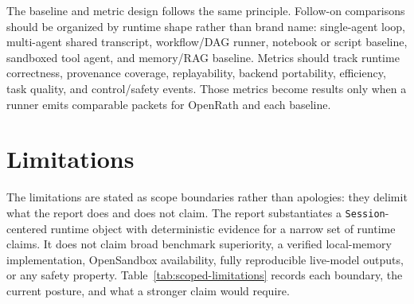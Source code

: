 \documentclass{llmxive}
\begin{document}
The baseline and metric design follows the same principle. Follow-on comparisons
should be organized by runtime shape rather than brand name: single-agent loop,
multi-agent shared transcript, workflow/DAG runner, notebook or script
baseline, sandboxed tool agent, and memory/RAG baseline. Metrics should track
runtime correctness, provenance coverage, replayability, backend portability,
efficiency, task quality, and control/safety events. Those metrics become
results only when a runner emits comparable packets for OpenRath and each
baseline.

\section{Limitations}

The limitations are stated as scope boundaries rather than apologies: they
delimit what the report does and does not claim. The report substantiates a
\texttt{Session}-centered runtime object with deterministic evidence for a
narrow set of runtime claims. It does not claim broad benchmark superiority, a
verified local-memory implementation, OpenSandbox availability, fully
reproducible live-model outputs, or any safety property.
Table~\ref{tab:scoped-limitations} records each boundary, the current posture,
and what a stronger claim would require.
\end{document}
